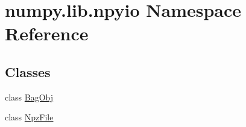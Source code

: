 \hypertarget{namespacenumpy_1_1lib_1_1npyio}{}\section{numpy.\+lib.\+npyio Namespace Reference}
\label{namespacenumpy_1_1lib_1_1npyio}
\subsection*{Classes}
\begin{DoxyCompactItemize}
\item 
class \hyperlink{classnumpy_1_1lib_1_1npyio_1_1BagObj}{Bag\+Obj}
\item 
class \hyperlink{classnumpy_1_1lib_1_1npyio_1_1NpzFile}{Npz\+File}
\end{DoxyCompactItemize}

